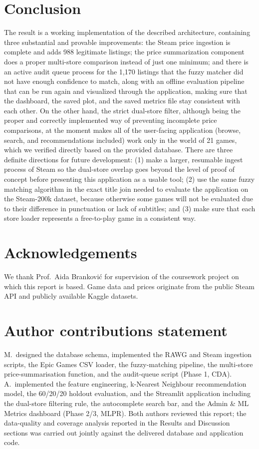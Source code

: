 \documentclass[fleqn,10pt]{wlscirep}
\begin{document}
\section*{Conclusion}

The result is a working implementation of the described architecture, containing three substantial and provable improvements: the Steam price ingestion is complete and adds 988 legitimate listings; the price summarization component does a proper multi-store comparison instead of just one minimum; and there is an active audit queue process for the 1,170 listings that the fuzzy matcher did not have enough confidence to match, along with an offline evaluation pipeline that can be run again and visualized through the application, making sure that the dashboard, the saved plot, and the saved metrics file stay consistent with each other. On the other hand, the strict dual-store filter, although being the proper and correctly implemented way of preventing incomplete price comparisons, at the moment makes all of the user-facing application (browse, search, and recommendations included) work only in the world of 21 games, which we verified directly based on the provided database. There are three definite directions for future development: (1) make a larger, resumable ingest process of Steam so the dual-store overlap goes beyond the level of proof of concept before presenting this application as a usable tool; (2) use the same fuzzy matching algorithm in the exact title join needed to evaluate the application on the Steam-200k dataset, because otherwise some games will not be evaluated due to their difference in punctuation or lack of subtitles; and (3) make sure that each store loader represents a free-to-play game in a consistent way.

\section*{Acknowledgements}

We thank Prof.\ Aida Brankovi\'{c} for supervision of the coursework project on which this report is based. Game data and prices originate from the public Steam API and publicly available Kaggle datasets.

\section*{Author contributions statement}

M.\ designed the database schema, implemented the RAWG and Steam ingestion scripts, the Epic Games CSV loader, the fuzzy-matching pipeline, the multi-store price-summarisation function, and the audit-queue script (Phase 1, CDA). A.\ implemented the feature engineering, k-Nearest Neighbour recommendation model, the 60/20/20 holdout evaluation, and the Streamlit application including the dual-store filtering rule, the autocomplete search bar, and the Admin \& ML Metrics dashboard (Phase 2/3, MLPR). Both authors reviewed this report; the data-quality and coverage analysis reported in the Results and Discussion sections was carried out jointly against the delivered database and application code.
\end{document}

